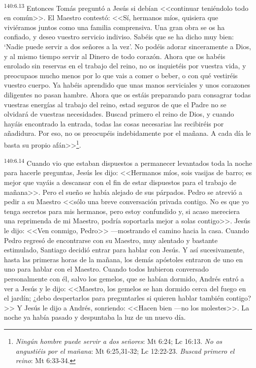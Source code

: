 \par 
\textsuperscript{140:6.13} Entonces Tomás preguntó a Jesús si debían <<continuar teniéndolo todo en común>>. El Maestro contestó: <<Sí, hermanos míos, quisiera que viviéramos juntos como una familia comprensiva. Una gran obra se os ha confiado, y deseo vuestro servicio indiviso. Sabéis que se ha dicho muy bien: `Nadie puede servir a dos señores a la vez'. No podéis adorar sinceramente a Dios, y al mismo tiempo servir al Dinero de todo corazón. Ahora que os habéis enrolado sin reservas en el trabajo del reino, no os inquietéis por vuestra vida, y preocupaos mucho menos por lo que vais a comer o beber, o con qué vestiréis vuestro cuerpo. Ya habéis aprendido que unas manos serviciales y unos corazones diligentes no pasan hambre. Ahora que os estáis preparando para consagrar todas vuestras energías al trabajo del reino, estad seguros de que el Padre no se olvidará de vuestras necesidades. Buscad primero el reino de Dios, y cuando hayáis encontrado la entrada, todas las cosas necesarias las recibiréis por añadidura. Por eso, no os preocupéis indebidamente por el mañana. A cada día le basta su propio afán>>\footnote{\textit{Ningún hombre puede servir a dos señores}: Mt 6:24; Lc 16:13. \textit{No os angustiéis por el mañana}: Mt 6:25,31-32; Lc 12:22-23. \textit{Buscad primero el reino}: Mt 6:33-34.}.

\par 
\textsuperscript{140:6.14} Cuando vio que estaban dispuestos a permanecer levantados toda la noche para hacerle preguntas, Jesús les dijo: <<Hermanos míos, sois vasijas de barro; es mejor que vayáis a descansar con el fin de estar dispuestos para el trabajo de mañana>>. Pero el sueño se había alejado de sus párpados. Pedro se atrevió a pedir a su Maestro <<sólo una breve conversación privada contigo. No es que yo tenga secretos para mis hermanos, pero estoy confundido y, si acaso mereciera una reprimenda de mi Maestro, podría soportarla mejor a solas contigo>>. Jesús le dijo: <<Ven conmigo, Pedro>> ---mostrando el camino hacia la casa. Cuando Pedro regresó de encontrarse con su Maestro, muy alentado y bastante estimulado, Santiago decidió entrar para hablar con Jesús. Y así sucesivamente, hasta las primeras horas de la mañana, los demás apóstoles entraron de uno en uno para hablar con el Maestro. Cuando todos hubieron conversado personalmente con él, salvo los gemelos, que se habían dormido, Andrés entró a ver a Jesús y le dijo: <<Maestro, los gemelos se han dormido cerca del fuego en el jardín; ¿debo despertarlos para preguntarles si quieren hablar también contigo?>> Y Jesús le dijo a Andrés, sonriendo: <<Hacen bien ---no los molestes>>. La noche ya había pasado y despuntaba la luz de un nuevo día.

